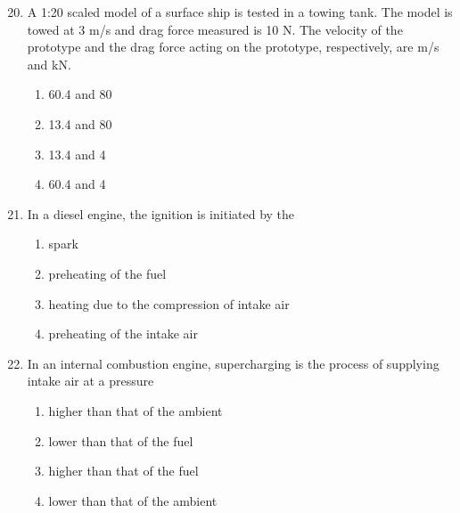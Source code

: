 \documentclass[journal]{IEEEtran}
\theoremstyle{remark}
\begin{document}
\begin{enumerate}[itemsep=1em]
\setcounter{enumi}{19}
\item A 1:20 scaled model of a surface ship is tested in a towing tank. The model is towed at 3 m/s and drag force measured is 10 N. The velocity of the prototype and the drag force acting on the prototype, respectively, are \underline{\hspace{1cm}} m/s and \underline{\hspace{1cm}} kN. 
\begin{multicols}{4}
\begin{enumerate}
    \item 60.4 and 80 
    \item 13.4 and 80 
    \item 13.4 and 4 
    \item 60.4 and 4 
\end{enumerate}   
\end{multicols}
\end{enumerate}
\newpage
\vspace*{0.25cm}
\begin{enumerate}[itemsep=1em]
\setcounter{enumi}{20}
\item In a diesel engine, the ignition is initiated by the 
\begin{enumerate}[leftmargin=2.5em, labelsep=0.5em, itemsep=0.5em]
    \item spark 
    \item preheating of the fuel 
    \item heating due to the compression of intake air 
    \item preheating of the intake air 
\end{enumerate}
\end{enumerate}

\begin{enumerate}[itemsep=1em]
\setcounter{enumi}{21}
\item In an internal combustion engine, supercharging is the process of supplying intake air at a pressure
\begin{enumerate}[leftmargin=2.5em, labelsep=0.5em, itemsep=0.5em]
    \item higher than that of the ambient 
    \item lower than that of the fuel 
    \item higher than that of the fuel 
    \item lower than that of the ambient 
\end{enumerate}
\end{enumerate}
\end{document}
